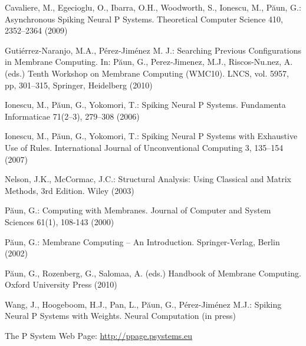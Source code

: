 \documentclass[runningheads]{llncs}
\begin{document}
\begin{thebibliography}{99}

Cavaliere, M., Egecioglu, O., Ibarra, O.H., Woodworth, S., Ionescu,
M., P\u{a}un, G.: Asynchronous Spiking Neural P Systems. Theoretical
Computer Science 410, 2352--2364 (2009)

Guti\'errez-Naranjo, M.A., P\'{e}rez-Jim\'{e}nez M. J.: Searching
Previous Configurations in Membrane Computing. In: P\u{a}un, G.,
Perez-Jimenez, M.J., Riscos-Nu.nez, A. (eds.) Tenth Workshop
on Membrane Computing (WMC10). LNCS, vol. 5957, pp, 301--315,
Springer, Heidelberg (2010)

Ionescu, M., P\u{a}un, G., Yokomori, T.: Spiking Neural P Systems.
Fundamenta Informaticae 71(2--3), 279--308 (2006)

Ionescu, M., P\u{a}un, G., Yokomori, T.: Spiking Neural P Systems
with Exhaustive Use of Rules. International Journal of
Unconventional Computing 3, 135--154 (2007)

Nelson, J.K., McCormac, J.C.: Structural Analysis: Using Classical
and Matrix Methods, 3rd Edition. Wiley (2003)

P\u aun, G.: Computing with Membranes. Journal of Computer and
System Sciences 61(1), 108-143 (2000)

P\u{a}un, G.: Membrane Computing -- An Introduction.
Springer-Verlag, Berlin (2002)

 P\u{a}un, G., Rozenberg, G., Salomaa, A. (eds.)
Handbook of Membrane Computing. Oxford University Press (2010)

Wang, J., Hoogeboom, H.J., Pan, L., P\u{a}un, G., P\'erez-Jim\'enez
M.J.: Spiking Neural P Systems with Weights. Neural Computation (in
press)

The P System Web Page: \url{http://ppage.psystems.eu}

\end{thebibliography}
\end{document}
